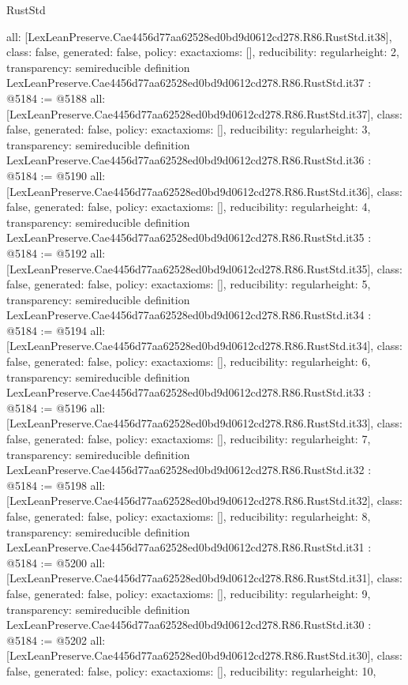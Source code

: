 \begin{lexlean}{RustStd}
\begin{coremodule}
{  all: [LexLeanPreserve.Cae4456d77aa62528ed0bd9d0612cd278.R86.RustStd.it38],
  class: false,
  generated: false,
  policy: exact{axioms: []},
  reducibility: regular{height: 2},
  transparency: semireducible
}
definition LexLeanPreserve.Cae4456d77aa62528ed0bd9d0612cd278.R86.RustStd.it37 : @5184 := @5188 {
  all: [LexLeanPreserve.Cae4456d77aa62528ed0bd9d0612cd278.R86.RustStd.it37],
  class: false,
  generated: false,
  policy: exact{axioms: []},
  reducibility: regular{height: 3},
  transparency: semireducible
}
definition LexLeanPreserve.Cae4456d77aa62528ed0bd9d0612cd278.R86.RustStd.it36 : @5184 := @5190 {
  all: [LexLeanPreserve.Cae4456d77aa62528ed0bd9d0612cd278.R86.RustStd.it36],
  class: false,
  generated: false,
  policy: exact{axioms: []},
  reducibility: regular{height: 4},
  transparency: semireducible
}
definition LexLeanPreserve.Cae4456d77aa62528ed0bd9d0612cd278.R86.RustStd.it35 : @5184 := @5192 {
  all: [LexLeanPreserve.Cae4456d77aa62528ed0bd9d0612cd278.R86.RustStd.it35],
  class: false,
  generated: false,
  policy: exact{axioms: []},
  reducibility: regular{height: 5},
  transparency: semireducible
}
definition LexLeanPreserve.Cae4456d77aa62528ed0bd9d0612cd278.R86.RustStd.it34 : @5184 := @5194 {
  all: [LexLeanPreserve.Cae4456d77aa62528ed0bd9d0612cd278.R86.RustStd.it34],
  class: false,
  generated: false,
  policy: exact{axioms: []},
  reducibility: regular{height: 6},
  transparency: semireducible
}
definition LexLeanPreserve.Cae4456d77aa62528ed0bd9d0612cd278.R86.RustStd.it33 : @5184 := @5196 {
  all: [LexLeanPreserve.Cae4456d77aa62528ed0bd9d0612cd278.R86.RustStd.it33],
  class: false,
  generated: false,
  policy: exact{axioms: []},
  reducibility: regular{height: 7},
  transparency: semireducible
}
definition LexLeanPreserve.Cae4456d77aa62528ed0bd9d0612cd278.R86.RustStd.it32 : @5184 := @5198 {
  all: [LexLeanPreserve.Cae4456d77aa62528ed0bd9d0612cd278.R86.RustStd.it32],
  class: false,
  generated: false,
  policy: exact{axioms: []},
  reducibility: regular{height: 8},
  transparency: semireducible
}
definition LexLeanPreserve.Cae4456d77aa62528ed0bd9d0612cd278.R86.RustStd.it31 : @5184 := @5200 {
  all: [LexLeanPreserve.Cae4456d77aa62528ed0bd9d0612cd278.R86.RustStd.it31],
  class: false,
  generated: false,
  policy: exact{axioms: []},
  reducibility: regular{height: 9},
  transparency: semireducible
}
definition LexLeanPreserve.Cae4456d77aa62528ed0bd9d0612cd278.R86.RustStd.it30 : @5184 := @5202 {
  all: [LexLeanPreserve.Cae4456d77aa62528ed0bd9d0612cd278.R86.RustStd.it30],
  class: false,
  generated: false,
  policy: exact{axioms: []},
  reducibility: regular{height: 10},
}
\end{coremodule}
\end{lexlean}
